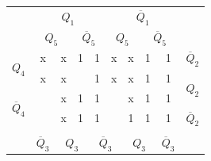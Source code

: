 \documentclass[a4paper,14pt]{article}
\begin{document}
\begin{table}[H]
\begin{minipage}{.5\linewidth}
\begin{tabular}{cccccccccc}
\end{tabular}
	\end{minipage}%
	\begin{minipage}{.5\linewidth}
		\centering
\begin{tabular}{cccccccccc}
	& \multicolumn{4}{c}{$Q_1$}                                                                         & \multicolumn{4}{c}{$\overline{Q}_1$}                                                              &                        \\
	& \multicolumn{2}{c}{$Q_5$}                       & \multicolumn{2}{c}{$\overline{Q}_5$}            & \multicolumn{2}{c}{$Q_5$}                       & \multicolumn{2}{c}{$\overline{Q}_5$}            &                        \\ \cline{2-9}
	\multicolumn{1}{c|}{\multirow{2}{*}{$Q_4$}}            & \multicolumn{1}{c|}{x} & \multicolumn{1}{c|}{x} & \multicolumn{1}{c|}{1} & \multicolumn{1}{c|}{1} & \multicolumn{1}{c|}{x} & \multicolumn{1}{c|}{x} & \multicolumn{1}{c|}{1} & \multicolumn{1}{c|}{1} & $\overline{Q}_2$       \\ \cline{2-9}
	\multicolumn{1}{c|}{}                                  & \multicolumn{1}{c|}{x} & \multicolumn{1}{c|}{x} & \multicolumn{1}{c|}{}  & \multicolumn{1}{c|}{1} & \multicolumn{1}{c|}{x} & \multicolumn{1}{c|}{x} & \multicolumn{1}{c|}{1} & \multicolumn{1}{c|}{1} & \multirow{2}{*}{$Q_2$} \\ \cline{2-9}
	\multicolumn{1}{c|}{\multirow{2}{*}{$\overline{Q}_4$}} & \multicolumn{1}{c|}{}  & \multicolumn{1}{c|}{x} & \multicolumn{1}{c|}{1} & \multicolumn{1}{c|}{1} & \multicolumn{1}{c|}{}  & \multicolumn{1}{c|}{x} & \multicolumn{1}{c|}{1} & \multicolumn{1}{c|}{1} &                        \\ \cline{2-9}
	\multicolumn{1}{c|}{}                                  & \multicolumn{1}{c|}{}  & \multicolumn{1}{c|}{x} & \multicolumn{1}{c|}{1} & \multicolumn{1}{c|}{1} & \multicolumn{1}{c|}{}  & \multicolumn{1}{c|}{1} & \multicolumn{1}{c|}{1} & \multicolumn{1}{c|}{1} & $\overline{Q}_2$       \\ \cline{2-9}
	&                        & \multicolumn{2}{c}{}                            & \multicolumn{2}{c}{}                            & \multicolumn{2}{c}{}                            &                        &                        \\
	& $\overline{Q}_3$       & \multicolumn{2}{c}{$Q_3$}                       & \multicolumn{2}{c}{$\overline{Q}_3$}            & \multicolumn{2}{c}{$Q_3$}                       & $\overline{Q}_3$       &                       
\end{tabular}
	\end{minipage} 
\end{table}
\end{document}
